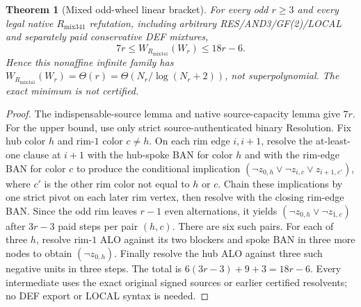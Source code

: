 \documentclass[11pt]{article}
\newtheorem{theorem}{Theorem}
\begin{document}
\begin{theorem}[Mixed odd-wheel linear bracket]
For \emph{every} odd $r\ge3$ and every legal native $R_{\mathrm{mix341}}$ refutation, including arbitrary RES/AND3/GF(2)/LOCAL and separately paid conservative DEF mixtures,
\[
\boxed{7r\le W_{R_{\mathrm{mix341}}}(W_r)\le18r-6.}
\]
Hence this nonaffine infinite family has $W_{R_{\mathrm{mix341}}}(W_r)=\Theta(r)=\Theta(N_r/\log(N_r+2))$, not superpolynomial. The exact minimum is not certified.
\end{theorem}
\begin{proof}
The indispensable-source lemma and native source-capacity lemma give $7r$. For the upper bound, use only strict source-authenticated binary Resolution. Fix hub color $h$ and rim-$1$ color $c\ne h$. On each rim edge $i,i+1$, resolve the at-least-one clause at $i+1$ with the hub-spoke BAN for color $h$ and with the rim-edge BAN for color $c$ to produce the conditional implication
$(\neg z_{0,h}\vee\neg z_{i,c}\vee z_{i+1,c'})$,
where $c'$ is the other rim color not equal to $h$ or $c$. Chain these implications by one strict pivot on each later rim vertex, then resolve with the closing rim-edge BAN. Since the odd rim leaves $r-1$ even alternations, it yields $(\neg z_{0,h}\vee\neg z_{1,c})$ after $3r-3$ paid steps per pair $(h,c)$. There are six such pairs. For each of three $h$, resolve rim-$1$ ALO against its two blockers and spoke BAN in three more nodes to obtain $(\neg z_{0,h})$. Finally resolve the hub ALO against three such negative units in three steps. The total is $6(3r-3)+9+3=18r-6$. Every intermediate uses the exact original signed sources or earlier certified resolvents; no DEF export or LOCAL syntax is needed.
\end{proof}
\end{document}

